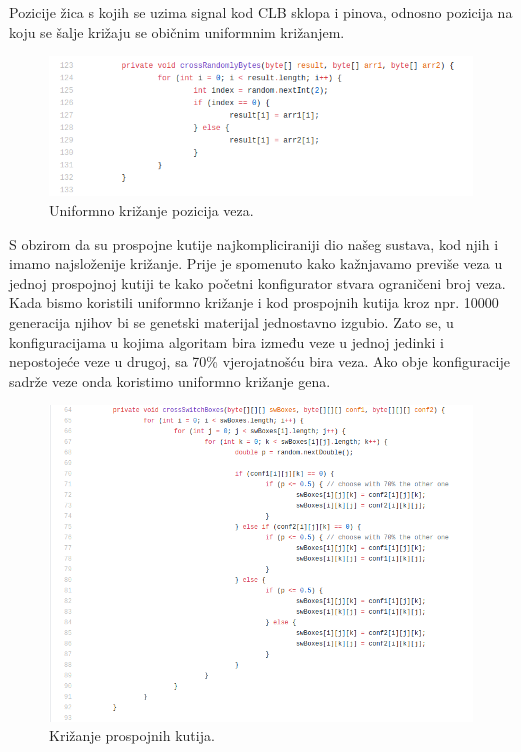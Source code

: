 \documentclass[times, utf8, zavrsni]{fer}
\begin{document}
	Pozicije žica s kojih se uzima signal kod CLB sklopa i pinova, odnosno pozicija na koju se šalje križaju se običnim uniformnim križanjem. 
	
	\begin{figure}[H]
		\centering
		\includegraphics[width=18cm]{slike/crossRandomlyBytes.png}
		\caption{Uniformno križanje pozicija veza.}
		\label{fig:uniform-connection-crossing}
	\end{figure} 
	
	S obzirom da su prospojne kutije najkompliciraniji dio našeg sustava, kod njih i imamo najsloženije križanje. Prije je spomenuto kako kažnjavamo previše veza u jednoj prospojnoj kutiji te kako početni konfigurator stvara ograničeni broj veza. Kada bismo koristili uniformno križanje i kod prospojnih kutija kroz npr. 10000 generacija njihov bi se genetski materijal jednostavno izgubio. Zato se, u konfiguracijama u kojima algoritam bira između veze u jednoj jedinki i nepostojeće veze u drugoj, sa 70\% vjerojatnošću bira veza. Ako obje konfiguracije sadrže veze onda koristimo uniformno križanje gena. 
	
	\begin{figure}[H]
		\centering
		\includegraphics[width=18cm]{slike/crossSwBoxes.png}
		\caption{Križanje prospojnih kutija.}
		\label{fig:sw-boxes-crossing}
	\end{figure} 
	
\end{document}
